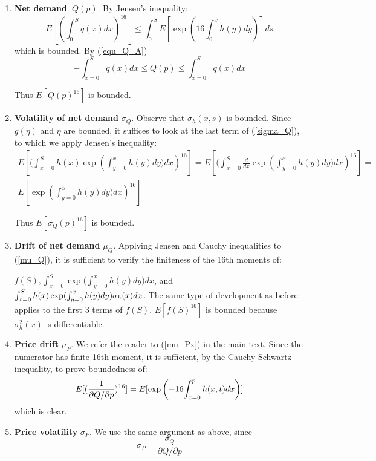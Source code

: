 \documentclass{article}
\begin{document}
\begin{enumerate}
\item \textbf{Net demand\ }$Q(p).$ By Jensen's inequality:%
\begin{equation*}
E[(\int_{0}^{S}q(x)dx)^{16}]\leq \int_{0}^{S}E[\exp (16\int_{0}^{x}h(y)dy)]ds
\end{equation*}%
which is bounded. By (\ref{equ_Q_A})
\begin{equation*}
-\int_{x=0}^{S}q(x)dx\leq Q(p)\leq \int_{x=0}^{S}q(x)dx
\end{equation*}

Thus $E[Q(p)^{16}]$ is bounded.

\item \textbf{Volatility of net demand }$\sigma _{Q}$. Observe that $\sigma
_{h}(x,s)$ is bounded. Since $g(\eta )$ and $\eta $ are bounded, it suffices
to look at the last term of (\ref{sigma_Q}), to which we apply Jensen's
inequality:%
\begin{gather*}
E[(\int_{x=0}^{S}{h(x)}\exp ({\int_{y=0}^{x}h(y)dy)}dx)^{16}]=E[(%
\int_{x=0}^{S}\frac{d}{dx}\exp ({\int_{y=0}^{x}h(y)dy)}dx)^{16}]= \\
E[\exp ({\int_{y=0}^{S}h(y)dy)}dx)^{16}]
\end{gather*}

Thus $E[\sigma _{Q}(p)^{16}]$ is bounded.

\item \textbf{Drift of net demand }$\mu _{Q}$. Applying Jensen and Cauchy
inequalities to (\ref{mu_Q}), it is sufficient to verify the finiteness of
the 16th moments of:

$f(S),\int_{x=0}^{S}\exp ({\int_{y=0}^{x}h(y)dy)dx}$, and $\int_{x=0}^{S}{%
h(x)}\exp ({\int_{y=0}^{x}h(y)dy)\sigma _{h}(x)dx}$. The same type of
development as before applies to the first 3 terms of $f(S)$. $E[f(S)^{16}]$
is bounded because $\sigma _{h}^{2}(x)$ is differentiable.

\item \textbf{Price drift }$\mu _{P}$. We refer the reader to (\ref{mu_Px})
in the main text. Since the numerator has finite 16th moment, it is
sufficient, by the Cauchy-Schwartz inequality, to prove boundedness of:%
\begin{equation*}
E[(\frac{1}{\partial Q/\partial p})^{16}]=E[\exp \left( -16{%
\int_{x=0}^{p}h(x,t)dx}\right) ]
\end{equation*}%
\qquad which is clear.

\item \textbf{Price volatility }$\sigma _{P}$. We use the same argument as
above, since%
\begin{equation*}
\sigma _{P}=\frac{\sigma _{Q}}{\partial Q/\partial p}
\end{equation*}


\end{enumerate}
\end{document}

